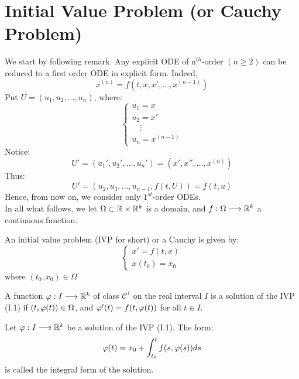\section{Initial Value Problem (or Cauchy Problem)}
We start by following remark. Any explicit ODE of n$^{th} $-order $(n \geq 2)$ can be reduced 
to a first order ODE in explicit form. Indeed, 
\[
  x^{(n) }  = f(t, x, x', \hdots , x^{(n-1) }) 
\]
Put $U = (u_1, u_2, \hdots , u_{n})  $, where: 
\[
\begin{cases}
u_1 = x \\
u_2 = x' \\
\quad  \vdots \\
u_{n} = x^{(n-1) }
\end{cases}
\]
Notice:
\[
U' = (u_1', u_2', \hdots , u_{n}')  = 
(x', x'', \hdots , x^{(n) }) 
\]
Thus:
\[
U' = (u_2, u_3, \hdots , u_{n-1}, f(t, U) )  = \overline{f}(t, u) 
\]
Hence, from now on, we consider only $1^{st}$-order ODEs. \\
In all what follows, we let $\Omega \subset \mathbb{R}  \times \mathbb{R} ^{k}$ is a domain, and 
$ f : \Omega  \longrightarrow \mathbb{R} ^{k} $ a continuous function.
\begin{definition}[]
An initial value problem (IVP for short) or a Cauchy is given by: 
\[
\begin{cases}
x' = f(t, x)  \\
x(t_0) = x_0 
\end{cases}
\]
where $(t_0, x_0) \in \Omega $ 
\end{definition}
\begin{definition}[]
A function $ \varphi  : I \longrightarrow \mathbb{R} ^{k} $ of class $\mathcal{C} ^{1} $ on the real
interval $I $ is a solution of the IVP (I.1) if 
$(t, \varphi (t) )  \in  \Omega $, and $\varphi '(t) = f(t, \varphi (t) )   $ for all
$t \in  I $. 
\end{definition}
\begin{definition}[]
  Let $ \varphi  : I \longrightarrow \mathbb{R} ^{k} $ be a solution of the IVP (I.1). The form: 
  \[
    \varphi (t) =  x_0 + \int_{t_0}^{t} f(s, \varphi (s) )  ds
  \]
  is called the integral form of the solution.
\end{definition}
